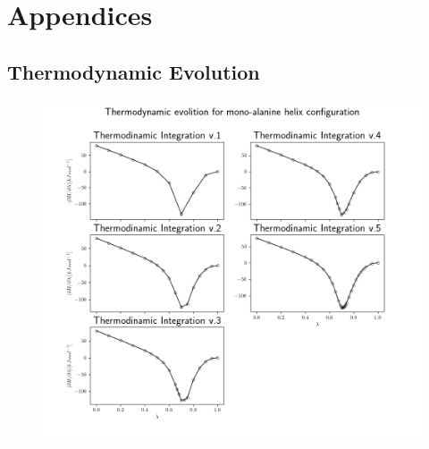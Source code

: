 
\section*{Appendices}
\subsection*{Thermodynamic Evolution}\label{subsec:TI_evolve}

\begin{figure}[h]
    \centering
    \includegraphics[scale=0.65]{Figures/Chapter_7/TI_evolution.png}
    \label{fig:TI_evolve}
\end{figure}
\newpage

